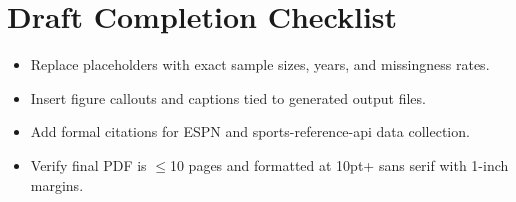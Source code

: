 \documentclass[10pt]{article}
\begin{document}
\section*{Draft Completion Checklist}
\begin{itemize}
  \item Replace placeholders with exact sample sizes, years, and missingness rates.
  \item Insert figure callouts and captions tied to generated output files.
  \item Add formal citations for ESPN and sports-reference-api data collection.
  \item Verify final PDF is $\leq$10 pages and formatted at 10pt+ sans serif with 1-inch margins.
\end{itemize}
\end{document}
